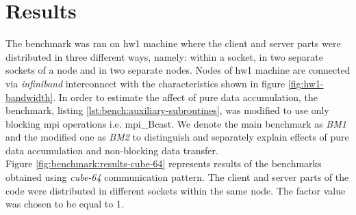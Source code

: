 \section{Results}
\label{sec:accumulator-results}


The benchmark was ran on \gls{hw1} machine where the client and server parts were distributed in three different ways, namely: within a socket, in two separate sockets of a node and in two separate nodes. Nodes of \gls{hw1} machine are connected via \textit{infiniband} interconnect with the characteristics shown in figure \ref{fig:hw1-bandwidth}. In order to estimate the affect of pure data accumulation, the benchmark, listing \ref{lst:bench:auxiliary-subroutines}, was modified to use only blocking \gls{mpi} operations i.e. \gls{mpi}\_Bcast. We denote the main benchmark as \textit{BM1} and the modified one as \textit{BM2} to distinguish and separately explain effects of pure data accumulation and non-blocking data transfer.\\


Figure \ref{fig:benchmark:results-cube-64} represents results of the benchmarks obtained using \textit{cube-64} communication pattern. The client and server parts of the code were distributed in different sockets within the same node. The factor value was chosen to be equal to 1.\\


